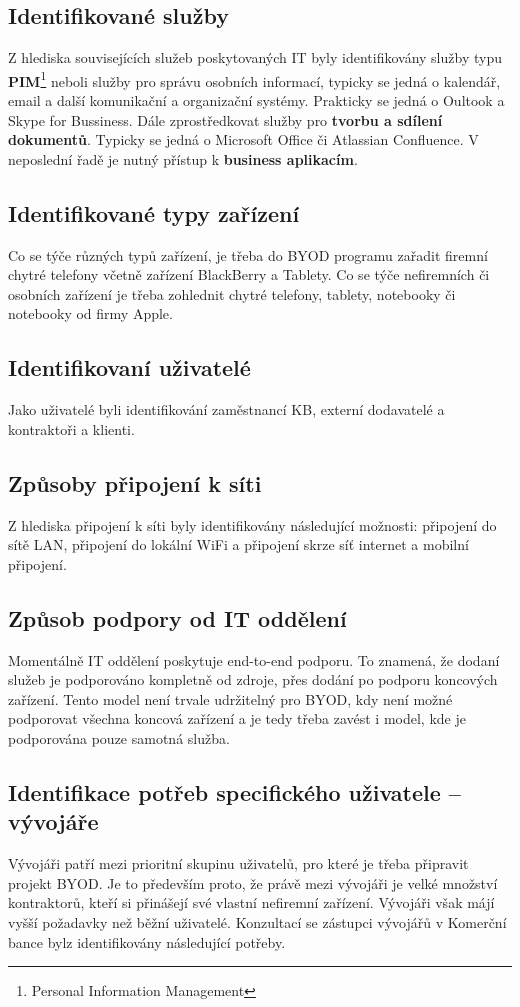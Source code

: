 \subsection{Identifikované služby}
Z hlediska souvisejících služeb poskytovaných IT byly identifikovány služby typu \textbf{PIM}\footnote{Personal Information Management} neboli služby pro správu osobních informací, typicky se jedná o kalendář, email a další komunikační a organizační systémy. Prakticky se jedná o Oultook a Skype for Bussiness. Dále zprostředkovat služby pro \textbf{tvorbu a sdílení dokumentů}. Typicky se jedná o Microsoft Office či Atlassian Confluence. V neposlední řadě je nutný přístup k \textbf{business aplikacím}.

\subsection{Identifikované typy zařízení}
Co se týče různých typů zařízení, je třeba do BYOD programu zařadit firemní chytré telefony včetně zařízení BlackBerry a Tablety. Co se týče nefiremních či osobních zařízení je třeba zohlednit chytré telefony, tablety, notebooky či notebooky od firmy Apple.

\subsection{Identifikovaní uživatelé}
Jako uživatelé byli identifikování zaměstnancí KB, externí dodavatelé a kontraktoři a klienti.

\subsection{Způsoby připojení k síti}
Z hlediska připojení k síti byly identifikovány následující možnosti: připojení do sítě LAN, připojení do lokální WiFi a připojení skrze síť internet a mobilní připojení.

\subsection{Způsob podpory od IT oddělení}
Momentálně IT oddělení poskytuje end-to-end podporu. To znamená, že dodaní služeb je podporováno kompletně od zdroje, přes dodání po podporu koncových zařízení. Tento model není trvale udržitelný pro BYOD, kdy není možné podporovat všechna koncová zařízení a je tedy třeba zavést i model, kde je podporována pouze samotná služba.

\subsection{Identifikace potřeb specifického uživatele -- vývojáře}
Vývojáři patří mezi prioritní skupinu uživatelů, pro které je třeba připravit projekt BYOD. Je to především proto, že právě mezi vývojáři je velké množství kontraktorů, kteří si přinášejí své vlastní nefiremní zařízení. Vývojáři však májí vyšší požadavky než běžní uživatelé. Konzultací se zástupci vývojářů v Komerční bance bylz identifikovány následující potřeby. 

